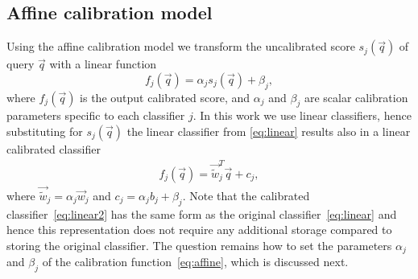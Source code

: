    \subsection{Affine calibration model}
   Using the affine calibration model we transform the uncalibrated score $s_j(\vec{q})$ of query $\vec{q}$ with a linear function 
     \begin{equation}
       f_j(\vec{q}) = \alpha_j s_j(\vec{q}) + \beta_j,
       \label{eq:affine}
     \end{equation}
	where 
	$ f_j(\vec{q})$ is the output calibrated score, and
	$\alpha_j$ and $\beta_j$ are scalar calibration parameters specific to each classifier $j$.
	In this work we use linear classifiers, hence substituting for $s_j(\vec{q})$ %
	the linear classifier from \eqref{eq:linear} results also in a linear calibrated classifier
    \begin{align}
    \label{eq:linear2}
        f_j(\vec{q}) = \vec{\widetilde{w}}_j^T \vec{q} + c_j,
     \end{align}
    where $\vec{\widetilde{w}}_j = \alpha_j\vec{w}_j$ and $c_j=\alpha_j b_j+\beta_j$. 
    Note that the calibrated classifier~\eqref{eq:linear2} has the same form as the original classifier~\eqref{eq:linear} and hence this representation does not require any additional storage compared to storing the original classifier. %
    The question remains how to set the parameters $\alpha_j$ and $\beta_j$ of the calibration function~\eqref{eq:affine}, which is discussed next.
    
  
    

